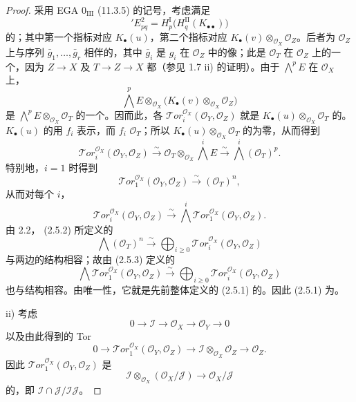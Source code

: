 \begin{proof}
采用 EGA $0_{\mathrm{III}}$ (11.3.5) 的记号，考虑满足
\[
{}'E^2_{pq}=H_p^{\mathrm I}\bigl(H_q^{\mathrm{II}}(K_{\bullet\bullet})\bigr)
\]
的；其中第一个指标对应 $K_\bullet(u)$，第二个指标对应 $K_\bullet(v)\otimes_{\mathcal O_X}\mathcal O_Z$。后者为 $\mathcal O_Z$ 上与序列 $\bar g_1,\ldots,\bar g_r$ 相伴的，其中 $\bar g_i$ 是 $g_i$ 在 $\mathcal O_Z$ 中的像；此是 $\mathcal O_T$ 在 $\mathcal O_Z$ 上的一个，因为 $Z\to X$ 及 $T\to Z\to X$ 都（参见 1.7 ii) 的证明）。由于 $\bigwedge^p E$ 在 $\mathcal O_X$ 上，
\[
\bigwedge^p E\otimes_{\mathcal O_X}\bigl(K_\bullet(v)\otimes_{\mathcal O_X}\mathcal O_Z\bigr)
\]
是 $\bigwedge^p E\otimes_{\mathcal O_X}\mathcal O_T$ 的一个。因而此，各 $\mathcal{T}or_i^{\mathcal O_X}(\mathcal O_Y,\mathcal O_Z)$ 就是 $K_\bullet(u)\otimes_{\mathcal O_X}\mathcal O_T$ 的。$K_\bullet(u)$ 的用 $f_i$ 表示，而 $f_i$  $\mathcal O_T$；所以 $K_\bullet(u)\otimes_{\mathcal O_X}\mathcal O_T$ 的为零，从而得到
\[
\mathcal{T}or_i^{\mathcal O_X}(\mathcal O_Y,\mathcal O_Z)
\xrightarrow{\sim}\mathcal O_T\otimes_{\mathcal O_X}\bigwedge^i E
\xrightarrow{\sim}\bigwedge^i(\mathcal O_T)^p.\tag{2.5.2}
\]
特别地，$i=1$ 时得到
\[
\mathcal{T}or_1^{\mathcal O_X}(\mathcal O_Y,\mathcal O_Z)\xrightarrow{\sim}(\mathcal O_T)^n,
\]
从而对每个 $i$，
\[
\mathcal{T}or_i^{\mathcal O_X}(\mathcal O_Y,\mathcal O_Z)
\xrightarrow{\sim}\bigwedge^i\mathcal{T}or_1^{\mathcal O_X}(\mathcal O_Y,\mathcal O_Z).\tag{2.5.3}
\]
由 2.2， (2.5.2) 所定义的
\[
\bigwedge(\mathcal O_T)^n\xrightarrow{\sim}\bigoplus_{i\geq0}\mathcal{T}or_i^{\mathcal O_X}(\mathcal O_Y,\mathcal O_Z)
\]
与两边的结构相容；故由 (2.5.3) 定义的
\[
\bigwedge\mathcal{T}or_1^{\mathcal O_X}(\mathcal O_Y,\mathcal O_Z)
\xrightarrow{\sim}\bigoplus_{i\geq0}\mathcal{T}or_i^{\mathcal O_X}(\mathcal O_Y,\mathcal O_Z)
\]
也与结构相容。由唯一性，它就是先前整体定义的 (2.5.1) 的。因此 (2.5.1) 为。

 ii) 考虑
\[
0\longrightarrow\mathcal I\longrightarrow\mathcal O_X\longrightarrow\mathcal O_Y\longrightarrow0
\]
以及由此得到的 Tor 
\[
0\longrightarrow\mathcal{T}or_1^{\mathcal O_X}(\mathcal O_Y,\mathcal O_Z)
\longrightarrow\mathcal I\otimes_{\mathcal O_X}\mathcal O_Z\longrightarrow\mathcal O_Z.
\]
因此 $\mathcal{T}or_1^{\mathcal O_X}(\mathcal O_Y,\mathcal O_Z)$ 是
\[
\mathcal I\otimes_{\mathcal O_X}(\mathcal O_X/\mathcal J)\longrightarrow\mathcal O_X/\mathcal J
\]
的，即 $\mathcal I\cap\mathcal J/\mathcal I\mathcal J$。


\end{proof}
